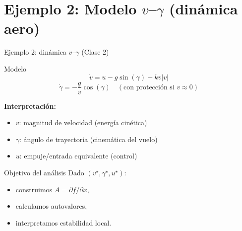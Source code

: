 \documentclass[aspectratio=169,10pt]{beamer}
\newcommand{\importantbox}[2][Importante]{%
\begin{alertblock}{#1}#2\end{alertblock}}
\begin{document}
\section{Ejemplo 2: Modelo $v$--$\gamma$ (dinámica aero)}

\begin{frame}{Ejemplo 2: dinámica $v$--$\gamma$ (Clase 2)}
\small

\begin{block}{Modelo}
\[
\dot{v}=u - g\sin(\gamma) - k v|v|
\]
\[
\dot{\gamma}= -\frac{g}{v}\cos(\gamma)
\quad(\text{con protección si } v\approx 0)
\]
\end{block}

\textbf{Interpretación:}
\begin{itemize}
\item $v$: magnitud de velocidad (energía cinética)
\item $\gamma$: ángulo de trayectoria (cinemática del vuelo)
\item $u$: empuje/entrada equivalente (control)
\end{itemize}

\importantbox[Objetivo del análisis]{
Dado $(v^\star,\gamma^\star,u^\star)$:
\begin{itemize}
\item construimos $A=\partial f/\partial x$,
\item calculamos autovalores,
\item interpretamos estabilidad local.
\end{itemize}
}

\end{frame}
\end{document}
